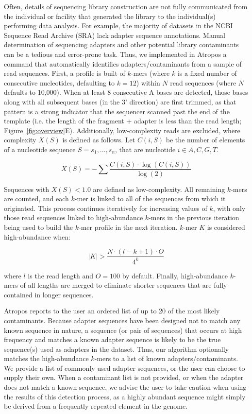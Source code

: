 \documentclass[fleqn,10pt,lineno]{wlpeerj} %
\begin{document}
Often, details of sequencing library construction are not fully communicated from the individual or facility that generated the library to the individual(s) performing data analysis. For example, the majority of datasets in the NCBI Sequence Read Archive (SRA) lack adapter sequence annotations. Manual determination of sequencing adapters and other potential library contaminants can be a tedious and error-prone task. Thus, we implemented in Atropos a command that automatically identifies adapters/contaminants from a sample of read sequences. First, a profile is built of $k$-mers (where $k$ is a fixed number of consecutive nucleotides, defaulting to $k=12$) within $N$ read sequences (where $N$ defaults to 10,000). When at least 8 consecutive A bases are detected, those bases along with all subsequent bases (in the 3' direction) are first trimmed, as that pattern is a strong indicator that the sequencer scanned past the end of the template (i.e. the length of the fragment + adapter is less than the read length; Figure~\ref{fig:overview}E). Additionally, low-complexity reads are excluded, where complexity $X(S)$ is defined as follows. Let $C(i,S)$ be the number of elements of a nucleotide sequence $S = s_{1}, ..., s_{n}$, that are nucleotide $i \in {A,C,G,T}$.

\begin{equation}
X(S) = -\sum \frac{C(i,S) \cdot \log(C(i,S))}{\log(2)}
\label{eq:complexity}
\end{equation}

Sequences with $X(S) < 1.0$ are defined as low-complexity. All remaining $k$-mers are counted, and each $k$-mer is linked to all of the sequences from which it originated. This process continues iteratively for increasing values of $k$, with only those read sequences linked to high-abundance $k$-mers in the previous iteration being used to build the $k$-mer profile in the next iteration. $k$-mer $K$ is considered high-abundance when:

\begin{equation}
|K| > \frac{N \cdot (l - k + 1) \cdot O}{4^k}
\label{eq:abundance}
\end{equation}

where $l$ is the read length and $O=100$ by default. Finally, high-abundance $k$-mers of all lengths are merged to eliminate shorter sequences that are fully contained in longer sequences.

Atropos reports to the user an ordered list of up to 20 of the most likely contaminants. Because adapter sequences have been designed not to match any known sequence in nature, a sequence (or pair of sequences) that occurs at high frequency and matches a known adapter sequence is likely to be the true sequence(s) used as adapters in the dataset. Thus, our algorithm optionally matches the high-abundance $k$-mers to a list of known adapters/contaminants. We provide a list of commonly used adapter sequences, or the user can choose to supply their own. When a contaminant list is not provided, or when the adapter does not match a known sequence, we advise the user to take caution when using the results of this detection process, as a highly abundant sequence might simply be derived from a frequently repeated element in the genome.
\end{document}
